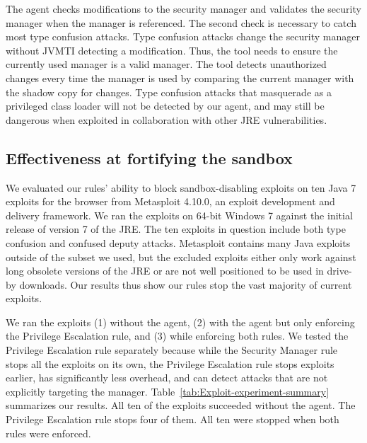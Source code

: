 \documentclass{sig-alternate}
\begin{document}
The agent checks modifications to the security manager and validates the security manager
when the manager is referenced.  The second check is necessary to
catch most type confusion attacks.  Type confusion attacks
change the security manager without JVMTI detecting a modification. 
Thus, the tool needs to ensure the currently used manager is a valid manager.  
The tool detects unauthorized changes every time the manager is 
used by comparing the current manager with the shadow copy for changes.
Type confusion attacks that masquerade as a privileged class loader 
will not be detected by our agent, and may still be dangerous when 
exploited in collaboration with other JRE vulnerabilities.

\subsection{Effectiveness at fortifying the sandbox}
\label{sub:Effectiveness-at-Fortifying}


We evaluated our rules' ability to block sandbox-disabling exploits on ten
Java 7 exploits for the browser from Metasploit 4.10.0, an exploit development
and delivery framework.  We ran the exploits on 64-bit Windows 7 against the initial release of
version 7 of the JRE.  The ten exploits in question include both type confusion and confused
deputy attacks.
Metasploit contains many Java exploits outside of the 
subset we used, but the excluded exploits either only work against long obsolete
versions of the JRE or are not well positioned to be used in drive-by
downloads.  Our results thus show our rules stop the vast majority of 
current exploits.

We ran the exploits
(1) without the agent, (2) with the agent but only enforcing the Privilege
Escalation rule, and (3) while enforcing both rules.
We tested the Privilege
Escalation rule separately because while the Security Manager rule
stops all the exploits on its own, the Privilege Escalation rule 
stops exploits earlier,
has significantly less overhead, and can detect attacks that are
not explicitly targeting the manager.
 Table~\ref{tab:Exploit-experiment-summary} 
summarizes our results.  All  
ten of the exploits succeeded without the agent. The Privilege Escalation rule
stops four of them.  All ten were stopped
when both rules were enforced. 
\end{document}
